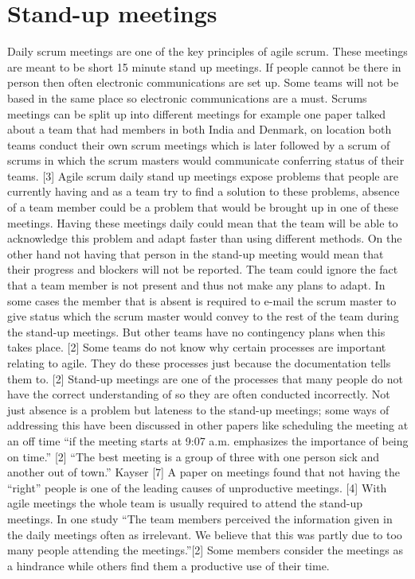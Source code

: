 \documentclass{scrartcl}
\begin{document}
\section{Stand-up meetings}
Daily scrum meetings are one of the key principles of agile scrum. These meetings are meant to be short 15 minute stand up meetings. If people cannot be there in person then often electronic communications are set up. Some teams will not be based in the same place so electronic communications are a must. Scrums meetings can be split up into different meetings for example one paper talked about a team that had members in both India and Denmark, on location both teams conduct their own scrum meetings which is later followed by a scrum of scrums in which the scrum masters would communicate conferring status of their teams. [3]
Agile scrum daily stand up meetings expose problems that people are currently having and as a team try to find a solution to these problems, absence of a team member could be a problem that would be brought up in one of these meetings. Having these meetings daily could mean that the team will be able to acknowledge this problem and adapt faster than using different methods.  On the other hand not having that person in the stand-up meeting would mean that their progress and blockers will not be reported. The team could ignore the fact that a team member is not present and thus not make any plans to adapt.
In some cases the member that is absent is required to e-mail the scrum master to give status which the scrum master would convey to the rest of the team during the stand-up meetings. But other teams have no contingency plans when this takes place. [2]
Some teams do not know why certain processes are important relating to agile. They do these processes just because the documentation tells them to. [2] Stand-up meetings are one of the processes that many people do not have the correct understanding of so they are often conducted incorrectly.
Not just absence is a problem but lateness to the stand-up meetings; some ways of addressing this have been discussed in other papers like scheduling the meeting at an off time “if the meeting starts at 9:07 a.m. emphasizes the importance of being on time.” [2]
“The best meeting is a group of three with one person sick and another out of town.” Kayser [7]
A paper on meetings found that not having the “right” people is one of the leading causes of unproductive meetings. [4] With agile meetings the whole team is usually required to attend the stand-up meetings. In one study “The team members perceived the information given in the daily meetings often as irrelevant. We believe that this was partly due to too many people attending the meetings.”[2] Some members consider the meetings as a hindrance while others find them a productive use of their time.
\end{document}
